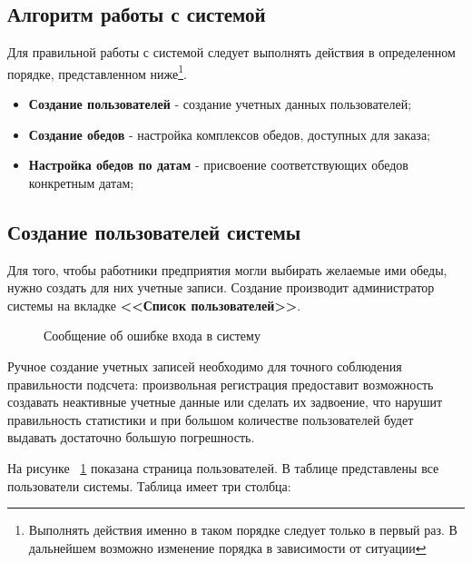\documentclass[a4paper]{article}
\begin{document}
\subsection{Алгоритм работы с системой}

Для правильной работы с системой следует выполнять действия в определенном порядке, представленном ниже\footnote{Выполнять действия именно в таком порядке следует только в первый раз. В дальнейшем возможно изменение порядка в зависимости от ситуации}.

\begin{itemize}
\setlength{\itemsep}{-2mm}
	\item \textbf{Создание пользователей} - создание учетных данных пользователей;
	\item \textbf{Создание обедов} - настройка комплексов обедов, доступных для заказа;
	\item \textbf{Настройка обедов по датам} -  присвоение соответствующих обедов конкретным датам;
\end{itemize}

\subsection{Создание пользователей системы}

Для того, чтобы работники предприятия могли выбирать желаемые ими обеды, нужно создать для них учетные записи. Создание производит администратор системы на вкладке \textbf{<<Список пользователей>>}.

\begin{figure}[h]
\caption{Сообщение об ошибке входа в систему}
\label{fig:image8}
\end{figure}

Ручное создание учетных записей необходимо для точного соблюдения правильности подсчета: произвольная регистрация предоставит возможность создавать неактивные учетные данные или сделать их задвоение, что нарушит правильность статистики и при большом количестве пользователей будет выдавать достаточно большую погрешность.

На рисунке ~\ref{fig:image8} показана страница пользователей. В таблице представлены все пользователи системы. Таблица имеет три столбца:
\end{document}
